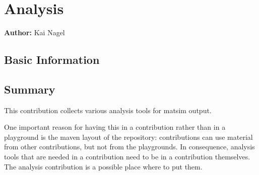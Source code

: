 \chapter{Analysis}
\label{sec:contrib-analysis}

\hfill \textbf{Author:} Kai Nagel




\section{Basic Information}


\section{Summary}
This \gls{contribution} collects various analysis tools for \gls{matsim} output.  

One important reason for having this in a \gls{contribution} rather than in a playground is the \gls{maven} layout of the repository: \Glspl{contribution} can use material from other \glspl{contribution}, but not from the playgrounds. 
In consequence, analysis tools that are needed in a \gls{contribution} need to be in a \gls{contribution} themselves. 
The analysis \gls{contribution} is a possible place where to put them.
